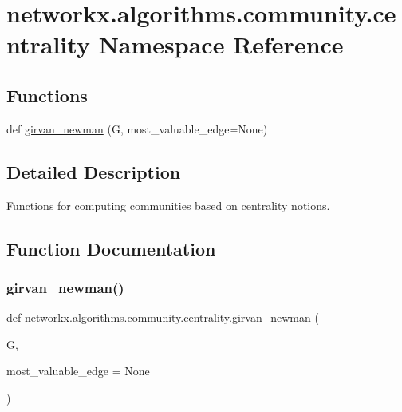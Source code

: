 \hypertarget{namespacenetworkx_1_1algorithms_1_1community_1_1centrality}{}\section{networkx.\+algorithms.\+community.\+centrality Namespace Reference}
\label{namespacenetworkx_1_1algorithms_1_1community_1_1centrality}
\subsection*{Functions}
\begin{DoxyCompactItemize}
\item 
def \hyperlink{namespacenetworkx_1_1algorithms_1_1community_1_1centrality_ab3a5307cb7c52b8a9a3c389a44fd1b75}{girvan\+\_\+newman} (G, most\+\_\+valuable\+\_\+edge=None)
\end{DoxyCompactItemize}


\subsection{Detailed Description}
\begin{DoxyVerb}Functions for computing communities based on centrality notions.\end{DoxyVerb}
 

\subsection{Function Documentation}
\mbox{\label{namespacenetworkx_1_1algorithms_1_1community_1_1centrality_ab3a5307cb7c52b8a9a3c389a44fd1b75}} 
\subsubsection{\texorpdfstring{girvan\+\_\+newman()}{girvan\_newman()}}
{\footnotesize\ttfamily def networkx.\+algorithms.\+community.\+centrality.\+girvan\+\_\+newman (\begin{DoxyParamCaption}\item[{}]{G,  }\item[{}]{most\+\_\+valuable\+\_\+edge = {\ttfamily None} }\end{DoxyParamCaption})}

